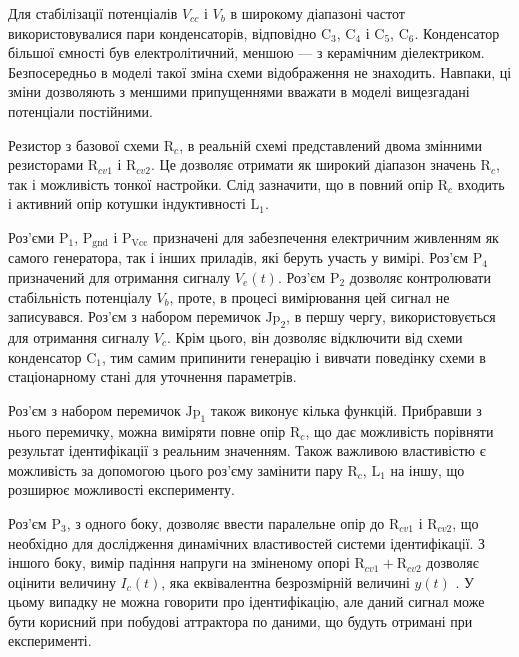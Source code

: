 Для стабілізації потенціалів
$ V_{cc} $ і
$ V_b $ в широкому діапазоні частот використовувалися пари
конденсаторів, відповідно
$ \mathrm{C}_3 $,
$ \mathrm{C}_4 $ і
$ \mathrm{C}_5 $,
$ \mathrm{C}_6 $. Конденсатор більшої ємності був електролітичний,
меншою --- з керамічним діелектриком. Безпосередньо в моделі
такої зміна схеми відображення не знаходить. Навпаки, ці зміни
дозволяють з меншими припущеннями вважати в моделі вищезгадані
потенціали постійними.

Резистор з базової схеми
$ \mathrm{R}_c $, в реальній схемі представлений двома змінними резисторами
$ \mathrm{R}_{cv1} $ і $ \mathrm{R}_{cv2} $.
Це дозволяє отримати як широкий діапазон значень
$ \mathrm{R}_c $, так і можливість тонкої настройки. Слід зазначити,
що в повний опір
$ \mathrm{R}_c $ входить і активний опір котушки індуктивності
$ \mathrm{L}_{1} $.


Роз'єми
$ \mathrm{P}_1 $,
$ \mathrm{P}_\mathrm{gnd} $ і
$ \mathrm{P}_\mathrm{Vcc} $ призначені для забезпечення електричним
живленням як самого генератора, так і інших приладів, які беруть
участь у вимірі. Роз'єм
$ \mathrm{P}_4 $ призначений для отримання сигналу
$ V_e (t) $. Роз'єм
$ \mathrm{P}_2 $ дозволяє контролювати стабільність потенціалу
$ V_b $, проте, в процесі вимірювання цей сигнал не записувався. Роз'єм
з набором перемичок
$ \mathrm{Jp}_2 $, в першу чергу, використовується для отримання сигналу
$ V_c $. Крім цього, він дозволяє відключити від схеми конденсатор
$ \mathrm{C}_1 $, тим самим припинити генерацію і вивчати поведінку
схеми в стаціонарному стані для уточнення параметрів.

Роз'єм з набором перемичок
$ \mathrm{Jp}_1 $ також виконує кілька функцій. Прибравши з нього
перемичку, можна виміряти повне опір
$ \mathrm{R}_{c} $, що дає можливість порівняти результат ідентифікації
з реальним значенням. Також важливою властивістю є можливість
за допомогою цього роз'єму замінити пару
$ \mathrm{R}_{c} $,
$ \mathrm{L}_{1} $ на іншу, що розширює можливості експерименту.


Роз'єм
$ \mathrm{P}_{3} $, з одного боку, дозволяє ввести паралельне опір до
$ \mathrm{R}_{cv1} $ і
$ \mathrm{R}_{cv2} $, що необхідно для дослідження динамічних
властивостей системи ідентифікації. З іншого боку, вимір падіння
напруги на зміненому опорі
$ \mathrm{R}_{cv1} + \mathrm{R}_{cv2} $ дозволяє оцінити величину
$I_c(t) $, яка еквівалентна безрозмірній величині
$y(t)$ . У цьому випадку не можна говорити про ідентифікацію,
але даний сигнал може бути корисний при побудові аттрактора
по даними, що будуть отримані при експерименті.



